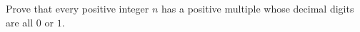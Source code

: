 Prove that every positive integer $n$ has a positive multiple whose decimal digits are all $0$ or $1$.
